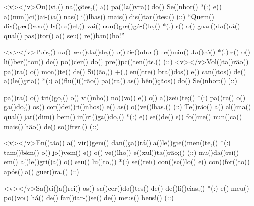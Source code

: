 <v></v>Ou()vi,() na()ções,() a() pa()la()vra() do() Se()nhor() *(:)
e() a()nun()ci()ai-()a() nas() i()lhas() mais() dis()tan()tes:() (::)
``Quem() dis()per()sou() Is()ra()el,() vai() con()gre()gá-()lo,() *(:)
e() o() guar()da()rá() qual() pas()tor() a() seu() re()ban()ho!''

<v></v>Pois,() na() ver()da()de,() o() Se()nhor() re()miu() Ja()có() *(:)
e() o() li()ber()tou() do() po()der() do() pre()po()ten()te.() (::)
<v></v>Vol()ta()rão() pa()ra() o() mon()te() de() Si()ão,() +(,)
en()tre() bra()dos() e() can()tos() de() a()le()gria() *(:)
a()flu()i()rão() pa()ra() as() bên()çãos() do() Se()nhor:() (::)

pa()ra() o() tri()go,() o() vi()nho() no()vo() e() o() a()zei()te;() *(:)
pa()ra() o() ga()do,() os() cor()dei()ri()nhos() e() as() o()ve()lhas.() (::)
Te()rão() a() al()ma() qual() jar()dim() bem() ir()ri()ga()do,() *(:)
e() se()de() e() fo()me() nun()ca() mais() hão() de() so()frer.() (::)

<v></v>En()tão() a() vir()gem() dan()ça()rá() a()le()gre()men()te,() *(:)
tam()bém() o() jo()vem() e() o() ve()lho() e()xul()ta()rão;() (::)
mu()da()rei() em() a()le()gri()a() o() seu() lu()to,() *(:)
se()rei() con()so()lo() e() con()for()to() após() a() guer()ra.() (::)

<v></v>Sa()ci()a()rei() os() sa()cer()do()tes() de() de()lí()cias,() *(:)
e() meu() po()vo() há() de() far()tar-()se() de() meus() bens!() (::)